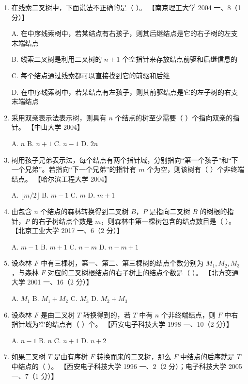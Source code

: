 \documentclass[lang=cn,newtx,10pt,scheme=chinese]{../../elegantbook}
\begin{document}
\begin{enumerate}
    \item 在线索二叉树中，下面说法不正确的是（ ）。  
    【南京理工大学 2004 一、8（1 分）】  

    A. 在中序线索树中，若某结点有右孩子，则其后继结点是它的右子树的左支末端结点  

    B. 线索二叉树是利用二叉树的 $n + 1$ 个空指针来存放结点前驱和后继信息的  

    C. 每个结点通过线索都可以直接找到它的前驱和后继 

    D. 在中序线索树中，若某结点有左孩子，则其前驱结点是它的左子树的右支末端结点  

    \item 采用双亲表示法表示树，则具有 $n$ 个结点的树至少需要（ ）个指向双亲的指针。  
    【中山大学 2004】  

    A. $n$ \quad B. $n + 1$ \quad C. $n - 1$ \quad D. $2n$  

    \item 树用孩子兄弟表示法，每个结点有两个指针域，分别指向“第一个孩子”和“下一个兄弟”。若指向“下一个兄弟”的指针有 $m$ 个为空，则该树有（ ）个非终端结点。  
    【哈尔滨工程大学 2004】  

    A. $\lfloor m / 2 \rfloor$ \quad B. $m - 1$ \quad C. $m$ \quad D. $m + 1$  

    \item 由包含 $n$ 个结点的森林转换得到二叉树 $B$，$P$ 是指向二叉树 $B$ 的树根的指针，$P$ 的右子树结点个数是 $m$，则森林中第一棵树包含的结点数目是（ ）。  
    【北京工业大学 2017 一、6（2 分）】  

    A. $m - 1$ \quad B. $m + 1$ \quad C. $n - m$ \quad D. $n - m + 1$  

    \item 设森林 $F$ 中有三棵树，第一、第二、第三棵树的结点个数分别为 $M_1, M_2, M_3$，与森林 $F$ 对应的二叉树根结点的右子树上的结点个数是（ ）。  
    【北方交通大学 2001 一、16（2 分）】  

    A. $M_1$ \quad B. $M_1 + M_2$ \quad C. $M_3$ \quad D. $M_2 + M_3$  

    \item 设森林 $F$ 是由二叉树 $T$ 转换得到的，若 $T$ 中有 $n$ 个非终端结点，则 $F$ 中右指针域为空的结点有（ ）个。  
    【西安电子科技大学 1998 一、10（2 分）】  

    A. $n - 1$ \quad B. $n$ \quad C. $n + 1$ \quad D. $n + 2$  

    \item 如果二叉树 $T$ 是由有序树 $F$ 转换而来的二叉树，那么 $F$ 中结点的后序就是 $T$ 中结点的（ ）。  
    【西安电子科技大学 1996 一、2（2 分）；电子科技大学 2005 一、7（1 分）】  


\end{enumerate}
\end{document}
